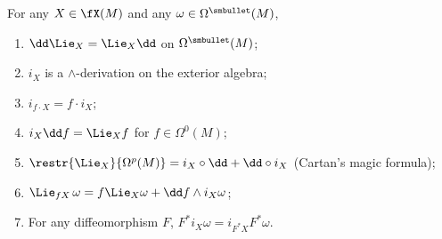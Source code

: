 \begin{prop} For any $X\in\fX(M)$ and any $\omega\in\Omega^{\smbullet }(M)$,
\begin{enumerate}
    \item $\dd\Lie_X=\Lie_X\dd$ on $\Omega^{\smbullet }(M)$;
    \item $i_X$ is a $\wedge$-derivation on the exterior algebra;
    \item $i_{f\cdot X}=f\cdot i_X$;
    \item $i_X\dd f=\Lie_X f$ for $f\in \Omega^0(M)$;
    \item $\restr{\Lie_X}{\Omega^p(M)}=i_X\circ\dd+\dd\circ i_X$ (Cartan's magic formula);
    \item $\Lie_{fX}\,\omega=f\Lie_X\omega +\dd f\wedge i_X\omega$;
    \item For any diffeomorphism $F$, $F^\ast i_X\omega =i_{F^\ast X}F^\ast\omega$.
\end{enumerate}
\end{prop}
